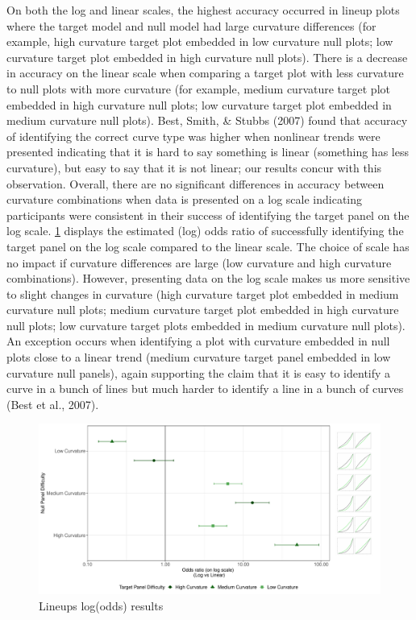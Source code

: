 \documentclass[print]{nuthesis}
\begin{document}
On both the log and linear scales, the highest accuracy occurred in lineup plots where the target model and null model had large curvature differences (for example, high curvature target plot embedded in low curvature null plots; low curvature target plot embedded in high curvature null plots).
There is a decrease in accuracy on the linear scale when comparing a target plot with less curvature to null plots with more curvature (for example, medium curvature target plot embedded in high curvature null plots; low curvature target plot embedded in medium curvature null plots).
Best, Smith, \& Stubbs (2007) found that accuracy of identifying the correct curve type was higher when nonlinear trends were presented indicating that it is hard to say something is linear (something has less curvature), but easy to say that it is not linear; our results concur with this observation.
Overall, there are no significant differences in accuracy between curvature combinations when data is presented on a log scale indicating participants were consistent in their success of identifying the target panel on the log scale.
\cref{fig:odds-ratio-plot} displays the estimated (log) odds ratio of successfully identifying the target panel on the log scale compared to the linear scale.
The choice of scale has no impact if curvature differences are large (low curvature and high curvature combinations).
However, presenting data on the log scale makes us more sensitive to slight changes in curvature (high curvature target plot embedded in medium curvature null plots; medium curvature target plot embedded in high curvature null plots; low curvature target plots embedded in medium curvature null plots).
An exception occurs when identifying a plot with curvature embedded in null plots close to a linear trend (medium curvature target panel embedded in low curvature null panels), again supporting the claim that it is easy to identify a curve in a bunch of lines but much harder to identify a line in a bunch of curves (Best et al., 2007).

\begin{figure}[tbp]

{\centering \includegraphics[width=\linewidth,]{thesis_files/figure-latex/odds-ratio-plot-1} 

}

\caption{Lineups log(odds) results}\label{fig:odds-ratio-plot}
\end{figure}
\end{document}
